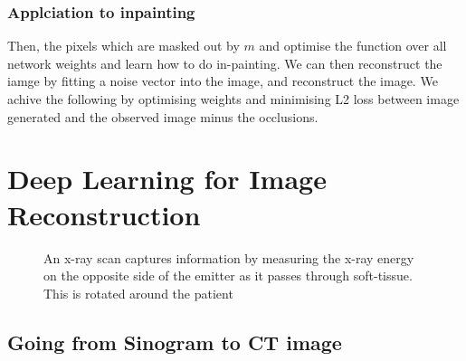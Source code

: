 \documentclass[11pt]{article}
\begin{document}
\subsubsection{Applciation to inpainting}

\begin{figure}[H]
    \centering
\end{figure}

Then, the pixels which are masked out by $m$ and optimise the function over all network weights and learn how to do in-painting. We can then reconstruct the iamge by fitting a noise vector into the image, and reconstruct the image. We achive the following by optimising weights and minimising L2 loss between image generated and the observed image minus the occlusions.

\section{Deep Learning for Image Reconstruction}

\begin{figure}[H]
    \centering
    \caption*{An x-ray scan captures information by measuring the x-ray energy on the opposite side of the emitter as it passes through soft-tissue. This is rotated around the patient}
\end{figure}

\subsection{Going from Sinogram to CT image}
\end{document}
